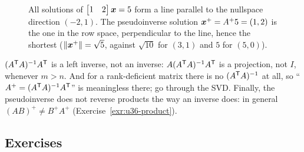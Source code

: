 \begin{figure}[ht]\centering
{}
\caption{All solutions of $\begin{bmatrix}1&2\end{bmatrix}\boldsymbol{x}=5$ form a line parallel to the nullspace direction $(-2,1)$. The pseudoinverse solution $\boldsymbol{x}^{+}=A^{+}5=(1,2)$ is the one in the row space, perpendicular to the line, hence the shortest ($\|\boldsymbol{x}^{+}\|=\sqrt5$, against $\sqrt{10}$ for $(3,1)$ and $5$ for $(5,0)$).}\label{fig:u36-minnorm}
\end{figure}

\begin{trap}
$(A^{\mathsf{T}} A)^{-1}A^{\mathsf{T}}$ is a left inverse, not an inverse: $A(A^{\mathsf{T}} A)^{-1}A^{\mathsf{T}}$ is a projection, not $I$, whenever $m>n$. And for a rank-deficient matrix there is no $(A^{\mathsf{T}} A)^{-1}$ at all, so ``$A^{+}=(A^{\mathsf{T}} A)^{-1}A^{\mathsf{T}}$'' is meaningless there; go through the SVD. Finally, the pseudoinverse does not reverse products the way an inverse does: in general $(AB)^{+}\neq B^{+}A^{+}$ (Exercise~\ref{exr:u36-product}).
\end{trap}

\subsection{Exercises}

